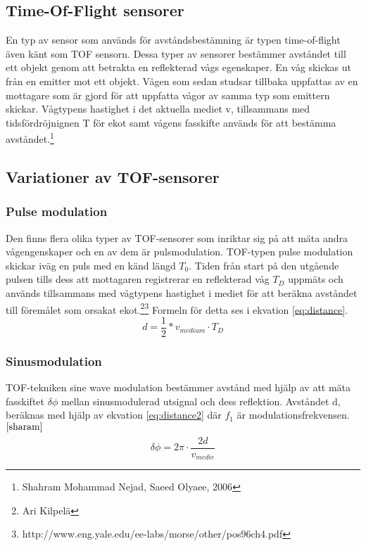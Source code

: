 \documentclass[a4paper,12pt,fleqn]{article}
\begin{document}
\subsection{Time-Of-Flight sensorer}
En typ av sensor som används för avståndsbestämning är typen time-of-flight även känt som TOF sensorn. Dessa typer av sensorer bestämmer avståndet till ett objekt genom att betrakta en reflekterad vågs egenskaper. 
En våg skickas ut från en emitter mot ett objekt. Vågen som sedan studsar tillbaka uppfattas av en mottagare som är gjord för att uppfatta vågor av samma typ som emittern skickar. Vågtypens hastighet i det aktuella mediet v, tillsammans med tidsfördröjnignen T för ekot samt vågens fasskifte används för att bestämma avståndet.\footnote{\label{sharam}Shahram Mohammad Nejad, Saeed Olyaee, 2006}



\subsection{Variationer av TOF-sensorer}

\subsubsection{Pulse modulation}
Den finns flera olika typer av TOF-sensorer som inriktar sig på att mäta andra vågengenskaper och en av dem är pulsmodulation.
TOF-typen pulse modulation skickar iväg en puls med en känd längd \begin{math}T_{0}\end{math}. Tiden från start på den utgående pulsen tills dess att mottagaren registrerar en reflekterad våg \begin{math}T_{D}\end{math} uppmäts och används tillsammans med vågtypens hastighet i mediet för att beräkna avståndet till föremålet som orsakat ekot.\footnote{Ari Kilpelä}\footnote{http://www.eng.yale.edu/ee-labs/morse/other/pos96ch4.pdf} Formeln för detta ses i ekvation \ref{eq:distance}.
\begin{equation}
\label{eq:distance}
d = \frac{1}{2}*v_{medium} \cdot T_D
\end{equation}

\subsubsection{Sinusmodulation}
TOF-tekniken sine wave modulation bestämmer avstånd med hjälp av att mäta fasskiftet \begin{math}\delta\phi\end{math} mellan sinusmodulerad utsignal och dess reflektion. Avståndet d, beräknas med hjälp av ekvation \ref{eq:distance2} där \begin{math}f_1\end{math} är modulationsfrekvensen. $^{\ref{sharam}}$
\begin{equation}
\label{eq:distance2}
\delta\phi = 2\pi \cdot \frac{2d}{v_{medie}}
\end{equation}
\end{document}
